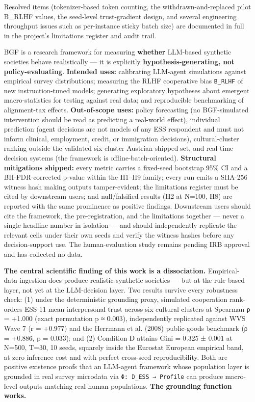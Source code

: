 Resolved items (tokenizer-based token counting, the withdrawn-and-replaced pilot B\_RLHF values, the seed-level trust-gradient design, and several engineering throughput issues such as per-instance sticky batch size) are documented in full in the project's limitations register and audit trail.


BGF is a research framework for measuring \textbf{whether} LLM-based synthetic societies behave realistically — it is explicitly \textbf{hypothesis-generating, not policy-evaluating}. \textbf{Intended uses:} calibrating LLM-agent simulations against empirical survey distributions; measuring the RLHF cooperative bias \texttt{B\_RLHF} of new instruction-tuned models; generating exploratory hypotheses about emergent macro-statistics for testing against real data; and reproducible benchmarking of alignment-tax effects. \textbf{Out-of-scope uses:} policy forecasting (no BGF-simulated intervention should be read as predicting a real-world effect), individual prediction (agent decisions are not models of any ESS respondent and must not inform clinical, employment, credit, or immigration decisions), cultural-cluster ranking outside the validated six-cluster Austrian-shipped set, and real-time decision systems (the framework is offline-batch-oriented). \textbf{Structural mitigations shipped:} every metric carries a fixed-seed bootstrap 95\% CI and a BH-FDR-corrected p-value within the H1–H9 family; every run emits a SHA-256 witness hash making outputs tamper-evident; the limitations register must be cited by downstream users; and null/falsified results (H2 at N=100, H8) are reported with the same prominence as positive findings. Downstream users should cite the framework, the pre-registration, and the limitations together — never a single headline number in isolation — and should independently replicate the relevant cells under their own seeds and verify the witness hashes before any decision-support use. The human-evaluation study remains pending IRB approval and has collected no data.


\textbf{The central scientific finding of this work is a dissociation.} Empirical-data ingestion does produce realistic synthetic societies — but at the rule-based layer, not yet at the LLM-decision layer. Two results survive every robustness check: (1) under the deterministic grounding proxy, simulated cooperation rank-orders ESS-11 mean interpersonal trust across six cultural clusters at Spearman ρ = +1.000 (exact permutation p ≈ 0.003), independently replicated against WVS Wave 7 (r = +0.977) and the Herrmann et al. (2008) public-goods benchmark (ρ = +0.886, p = 0.033); and (2) Condition D attains Gini = 0.325 ± 0.001 at N=500, T=30, 10 seeds, squarely inside the Eurostat European empirical band, at zero inference cost and with perfect cross-seed reproducibility. Both are positive existence proofs that an LLM-agent framework whose population layer is grounded in real survey microdata via \texttt{Φ: D\_ESS → Profile} can produce macro-level outputs matching real human populations. \textbf{The grounding function works.}

